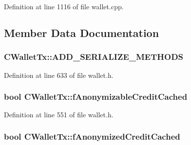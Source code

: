 Definition at line 1116 of file wallet.\+cpp.



\subsection{Member Data Documentation}
\hypertarget{class_c_wallet_tx_aad8df774858ddd54f06a76eb075f2823}{}
\subsubsection[{A\+D\+D\+\_\+\+S\+E\+R\+I\+A\+L\+I\+Z\+E\+\_\+\+M\+E\+T\+H\+O\+D\+S}]{\setlength{\rightskip}{0pt plus 5cm}C\+Wallet\+Tx\+::\+A\+D\+D\+\_\+\+S\+E\+R\+I\+A\+L\+I\+Z\+E\+\_\+\+M\+E\+T\+H\+O\+D\+S}\label{class_c_wallet_tx_aad8df774858ddd54f06a76eb075f2823}


Definition at line 633 of file wallet.\+h.

\hypertarget{class_c_wallet_tx_a5906462dc235739a410253a889c7c250}{}
\subsubsection[{f\+Anonymizable\+Credit\+Cached}]{\setlength{\rightskip}{0pt plus 5cm}bool C\+Wallet\+Tx\+::f\+Anonymizable\+Credit\+Cached\hspace{0.3cm}{\ttfamily [mutable]}}\label{class_c_wallet_tx_a5906462dc235739a410253a889c7c250}


Definition at line 551 of file wallet.\+h.

\hypertarget{class_c_wallet_tx_acec9ac9932baf1ca07e5b270f50d8f7e}{}
\subsubsection[{f\+Anonymized\+Credit\+Cached}]{\setlength{\rightskip}{0pt plus 5cm}bool C\+Wallet\+Tx\+::f\+Anonymized\+Credit\+Cached\hspace{0.3cm}{\ttfamily [mutable]}}\label{class_c_wallet_tx_acec9ac9932baf1ca07e5b270f50d8f7e}



